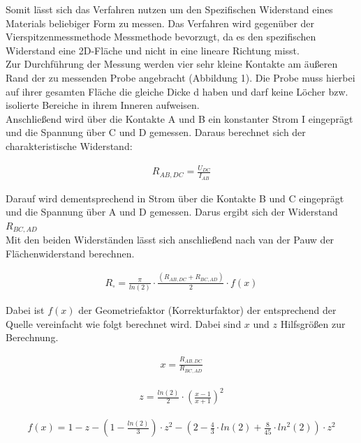 \documentclass[a4paper]{scrartcl}
\numberwithin{equation}{subsection}
\begin{document}
Somit lässt sich das Verfahren nutzen um den Spezifischen Widerstand eines Materials beliebiger Form zu messen. \cite{anl}
Das Verfahren wird gegenüber der Vierspitzenmessmethode Messmethode bevorzugt, da es den spezifischen Widerstand eine 2D-Fläche und nicht in eine lineare Richtung misst. \cite{phyglob} \\

Zur Durchführung der Messung werden vier sehr kleine Kontakte am äußeren Rand der zu messenden Probe angebracht (Abbildung 1). Die Probe muss hierbei auf ihrer gesamten Fläche die gleiche Dicke d haben und darf keine Löcher bzw. isolierte Bereiche in ihrem Inneren aufweisen. \cite{anl} \\

Anschließend wird über die Kontakte A und B ein konstanter Strom I eingeprägt und die Spannung über C und D gemessen. Daraus berechnet sich der charakteristische Widerstand: \cite{phyglob}

\begin{align}
R_{AB,DC} = \frac{U_{DC}}{I_{AB}}
\end{align}

Darauf wird dementsprechend in Strom über die Kontakte B und C eingeprägt und die Spannung über A und D gemessen. Darus ergibt sich der Widerstand $R_{BC,AD}$ \cite{anl} \\

Mit den beiden Widerständen lässt sich anschließend nach van der Pauw der Flächenwiderstand berechnen. \cite{anl}

\begin{align}
R_{\square} = \frac{\pi}{ln(2)} \cdot \frac{(R_{AB,DC}+R_{BC,AD})}{2} \cdot f(x)
\end{align}

Dabei ist $f(x)$ der Geometriefaktor (Korrekturfaktor) der entsprechend der Quelle \cite{anl} vereinfacht wie folgt berechnet wird. Dabei sind $x$ und $z$ Hilfsgrößen zur Berechnung.

\begin{align}
x = \frac{R_{AB,DC}}{R_{BC,AD}}
\end{align}

\begin{align}
z = \frac{ln(2)}{2} \cdot \left(\frac{x-1}{x+1}\right)^2
\end{align}

\begin{align}
f(x) = 1 - z - \left( 1-\frac{ln(2)}{3}\right)  \cdot z^2 - \left( 2 - \frac{4}{3} \cdot ln(2) + \frac{8}{45} \cdot ln^2(2)\right) \cdot z^2
\end{align}
\end{document}
